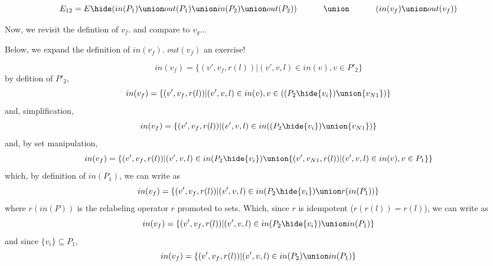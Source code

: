 \[
E_{12}  =  
   E\hide
  (
    in(P_1) \union out(P_1) \union in(P_2) \union out(P_2)
  ) \\
   \hphantom{E_{12}  = \;\;}   \union\ \\
\hphantom{E_{12}  = \;\;}   (in(v_f) \union out(v_f))\\ 
\]

Now, we  revisit the defintion of $v_f$. and compare to $v_g$...

Below, we expand the definition of $in(v_f)$. $out(v_f)$ an exercise!

\[
in(v_f) = \{(v',v_f,r(l))|(v',v,l) \in in(v), v\in P'_2\}
\]
\noindent
by defition of $P'_2$,
\[
in(v_f) = \{(v',v_f,r(l))|(v',v,l) \in in(v), v\in((P_2\hide\{v_i\})\union\{v_{N1}\})\}
\]
\noindent
and,  simplification, 
\[
in(v_f) = \{(v',v_f,r(l))|(v',v,l) \in in((P_2\hide\{v_i\}) \union \{v_{N1}\})\}
\]
\noindent
and, by set manipulation, 
\[
in(v_f) = \{(v',v_f,r(l))|(v',v,l) \in in(P_2\hide\{v_i\}) \union  \{(v',v_{N1},r(l))|(v',v,l)\in in(v), v\in P_1\}\}
\]
\noindent
which, by definition of $in(P_1)$, we can write as
\[
in(v_f) = \{(v',v_f,r(l))|(v',v,l) \in in(P_2\hide\{v_i\}) \union  r(in(P_1))\}
\]
\noindent
where $r(in(P))$ is the relabeling operator $r$ promoted to sets.  Which, since $r$ is idempotent ($r(r(l)) = r(l)$), we can write as
\[
in(v_f) = \{(v',v_f,r(l))|(v',v,l) \in in(P_2\hide\{v_i\}) \union  in(P_1)\}
\]
\noindent
and since $\{v_i\} \subseteq P_1$, 
\[
in(v_f) = \{(v',v_f,r(l))|(v',v,l) \in in(P_2) \union  in(P_1)\}
\]


\pagebreak

